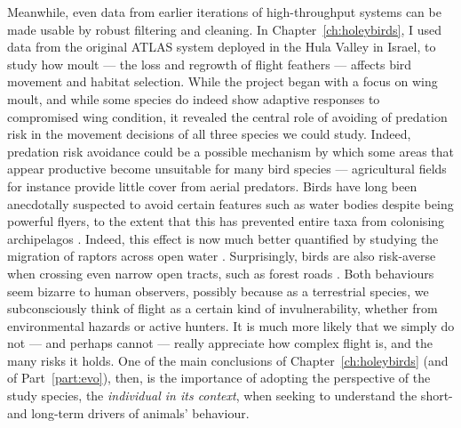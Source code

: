 Meanwhile, even data from earlier iterations of high-throughput systems can be made usable by robust filtering and cleaning.
In Chapter~\ref{ch:holeybirds}, I used data from the original ATLAS system deployed in the Hula Valley in Israel, to study how moult --- the loss and regrowth of flight feathers --- affects bird movement and habitat selection.
While the project began with a focus on wing moult, and while some species do indeed show adaptive responses to compromised wing condition, it revealed the central role of avoiding of predation risk in the movement decisions of all three species we could study.
Indeed, predation risk avoidance could be a possible mechanism by which some areas that appear productive become unsuitable for many bird species --- agricultural fields for instance provide little cover from aerial predators.
Birds have long been anecdotally suspected to avoid certain features such as water bodies despite being powerful flyers, to the extent that this has prevented entire taxa from colonising archipelagos  \citep{diamondWaterFear}.
Indeed, this effect is now much better quantified by studying the migration of raptors across open water \citep{nourhaniRaptorsWater}.
Surprisingly, birds are also risk-averse when crossing even narrow open tracts, such as forest roads \citep{forestRoadsBirds}.
Both behaviours seem bizarre to human observers, possibly because as a terrestrial species, we subconsciously think of flight as a certain kind of invulnerability, whether from environmental hazards or active hunters.
It is much more likely that we simply do not --- and perhaps cannot --- really appreciate how complex flight is, and the many risks it holds.
One of the main conclusions of Chapter~\ref{ch:holeybirds} (and of Part~\ref{part:evo}), then, is the importance of adopting the perspective of the study species, the \textit{individual in its context}, when seeking to understand the short- and long-term drivers of animals' behaviour.

